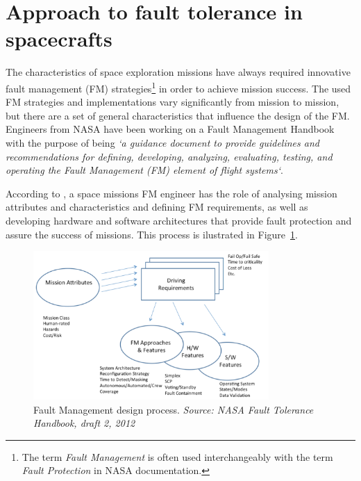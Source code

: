 \section{Approach to fault tolerance in spacecrafts}

The characteristics of space exploration missions have always required
innovative fault management (FM) strategies\footnote{The term \textit{Fault
Management} is often used interchangeably with the term \textit{Fault
Protection} in NASA documentation.} in order to achieve mission success.
The used FM strategies and implementations vary significantly from mission to
mission, but there are a set of general characteristics that influence the
design of the FM. Engineers from NASA have been working on a Fault Management
Handbook with the purpose of being \textit{`a guidance document to provide
guidelines and recommendations for defining, developing, analyzing, evaluating,
testing, and operating the Fault Management (FM) element of flight
systems`}\cite{nasa-fm-handbook}.
 
According to \cite{nasa-fm-handbook}, a space missions FM engineer has the role
of analysing mission attributes and characteristics and defining FM
requirements, as well as developing hardware and software architectures that
provide fault protection and assure the success of missions. This process is
ilustrated in Figure~\ref{fig:fm_design}.

\begin{figure}[htb] 
	\begin{center}
	\includegraphics[width=0.8\textwidth]{img/fm_design.png}
	\caption{Fault Management design process. \small{\textit{Source: NASA Fault
	Tolerance Handbook, draft 2, 2012}}}
	\label{fig:fm_design}
	\end{center}
\end{figure}

